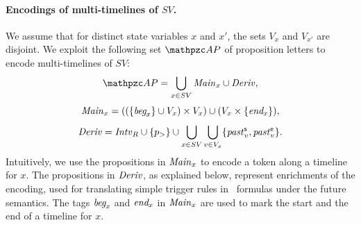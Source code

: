 \paragraph{Encodings of multi-timelines of $SV$.} We assume that for distinct state variables $x$ and $x'$, the sets $V_x$ and  $V_{x'}$
are disjoint. We exploit the following set $\Prop$ of proposition letters to encode multi-timelines of $SV$:
\[
\Prop = \bigcup_{x\in SV}\Main_x \cup \Deriv ,
\]
\[
{\mathit{Main}}_x = ((\{\textit{beg}_x \}\cup V_x) \times V_x)   \cup   (V_x \times \{\textit{end}_x\}),
\]
\[
{\mathit{Deriv}} = {\mathit{Intv}}_R \cup \{p_>\} \cup \bigcup_{x\in SV}\bigcup_{v\in V_x}\{{\mathit{past}}_v^{\mathsf{s}},{\mathit{past}}_v^{\mathsf{e}}\}.
\]
Intuitively, we use the propositions in ${\mathit{Main}}_x$ to encode a token along a timeline for $x$. The propositions in ${\mathit{Deriv}}$, as explained below, represent
enrichments of the encoding, used for translating simple trigger rules in \MTL\ formulas under the future semantics.
 The tags $\textit{beg}_x$ and $\textit{end}_x$ in ${\mathit{Main}}_x$ are used to mark the start and the end of a timeline  for $x$. 
 
